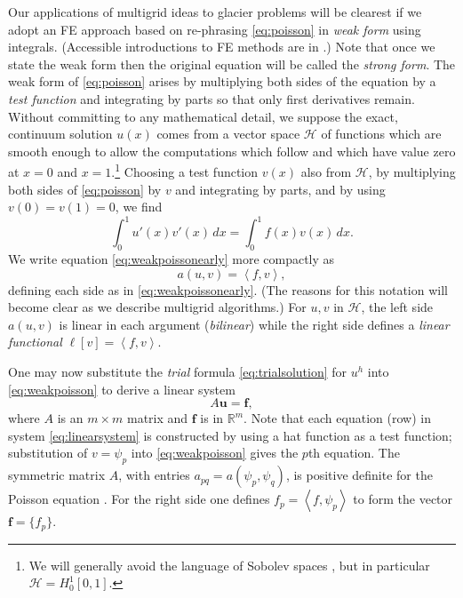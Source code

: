 \documentclass[letterpaper,final,12pt,reqno]{amsart}
\newcommand{\RR}{\mathbb{R}}
\newcommand{\bbf}{\mathbf{f}}
\newcommand{\bu}{\mathbf{u}}
\newcommand{\ip}[2]{\left<#1,#2\right>}
\begin{document}
Our applications of multigrid ideas to glacier problems will be clearest if we adopt an FE approach based on re-phrasing \eqref{eq:poisson} in \emph{weak form} using integrals.  (Accessible introductions to FE methods are in \cite{Bueler2021,Elmanetal2014,Johnson2009}.)  Note that once we state the weak form then the original equation will be called the \emph{strong form}.  The weak form of \eqref{eq:poisson} arises by multiplying both sides of the equation by a \emph{test function} and integrating by parts so that only first derivatives remain.  Without committing to any mathematical detail, we suppose the exact, continuum solution $u(x)$ comes from a vector space $\mathcal{H}$ of functions which are smooth enough to allow the computations which follow and which have value zero at $x=0$ and $x=1$.\footnote{We will generally avoid the language of Sobolev spaces \cite[for example]{Evans2010}, but in particular $\mathcal{H}=H_0^1[0,1]$.}  Choosing a test function $v(x)$ also from $\mathcal{H}$, by multiplying both sides of \eqref{eq:poisson} by $v$ and integrating by parts, and by using $v(0)=v(1)=0$, we find
\begin{equation}
\int_0^1 u'(x) v'(x)\,dx = \int_0^1 f(x) v(x)\, dx.  \label{eq:weakpoissonearly}
\end{equation}
We write equation \eqref{eq:weakpoissonearly} more compactly as
\begin{equation}
  a(u,v) = \ip{f}{v}, \label{eq:weakpoisson}
\end{equation}
defining each side as in \eqref{eq:weakpoissonearly}.  (The reasons for this notation will become clear as we describe multigrid algorithms.)  For $u,v$ in $\mathcal{H}$, the left side $a(u,v)$ is linear in each argument (\emph{bilinear}) while the right side defines a \emph{linear functional} $\ell[v] = \ip{f}{v}$.

One may now substitute the \emph{trial} formula \eqref{eq:trialsolution} for $u^h$ into \eqref{eq:weakpoisson} to derive a linear system
\begin{equation}
A \bu = \bbf, \label{eq:linearsystem}
\end{equation}
where $A$ is an $m\times m$ matrix and $\bbf$ is in $\RR^m$.  Note that each equation (row) in system \eqref{eq:linearsystem} is constructed by using a hat function as a test function; substitution of $v=\psi_p$ into \eqref{eq:weakpoisson} gives the $p$th equation.  The symmetric matrix $A$, with entries $a_{pq} = a(\psi_p,\psi_q)$, is positive definite for the Poisson equation \cite{Elmanetal2014}.  For the right side one defines $f_p = \ip{f}{\psi_p}$ to form the vector $\bbf = \{f_p\}$.
\end{document}
